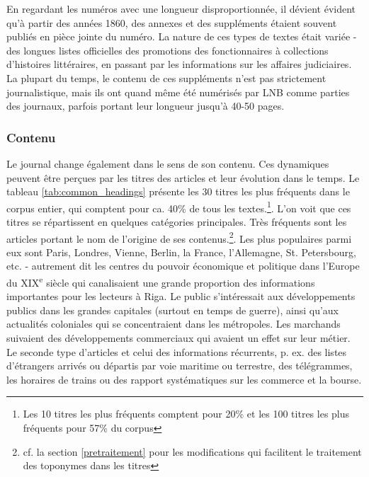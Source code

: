 \documentclass[a4paper,twoside,12pt]{article}
\begin{document}
En regardant les numéros avec une longueur disproportionnée, il dévient évident qu'à partir des années 1860, des annexes et des suppléments étaient souvent publiés en pièce jointe du numéro. La nature de ces types de textes était variée - des longues listes officielles des promotions des fonctionnaires à collections d'histoires littéraires, en passant par les informations sur les affaires judiciaires. La plupart du temps, le contenu de ces suppléments n'est pas strictement journalistique, mais ils ont quand même été numérisés par LNB comme parties des journaux, parfois portant leur longueur jusqu'à 40-50 pages.


\subsubsection{Contenu} \label{sujets_abordes}

Le journal change également dans le sens de son contenu. Ces dynamiques peuvent être perçues par les titres des articles et leur évolution dans le temps. Le tableau \ref{tab:common_headings} présente les 30 titres les plus fréquents dans le corpus entier, qui comptent pour ca. 40\% de tous les textes.\footnote{Les 10 titres les plus fréquents comptent pour 20\% et les 100 titres les plus fréquents pour 57\% du corpus}. L'on voit que ces titres se répartissent en quelques catégories principales. Très fréquents sont les articles portant le nom de l'origine de ses contenus.\footnote{cf. la section \ref{pretraitement} pour les modifications qui facilitent le traitement des toponymes dans les titres}. Les plus populaires parmi eux sont Paris, Londres, Vienne, Berlin, la France, l'Allemagne, St. Petersbourg, etc. - autrement dit les centres du pouvoir économique et politique dans l'Europe du XIX\textsuperscript{e} siècle qui canalisaient une grande proportion des informations importantes pour les lecteurs à Riga. Le public s'intéressait aux développements publics dans les grandes capitales (surtout en temps de guerre), ainsi qu'aux actualités coloniales qui se concentraient dans les métropoles. Les marchands suivaient des développements commerciaux qui avaient un effet sur leur métier. Le seconde type d'articles et celui des informations récurrents, p. ex. des listes d'étrangers arrivés ou départis par voie maritime ou terrestre, des télégrammes, les horaires de trains ou des rapport systématiques sur les commerce et la bourse.
\end{document}

